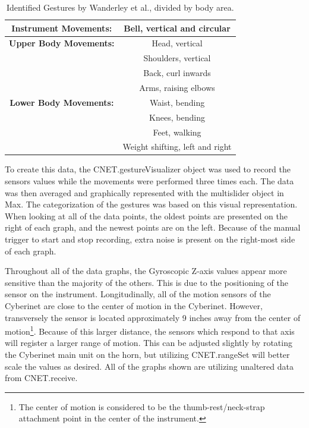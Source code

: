 \begin{table}[]
    \centering
    \begin{tabular}{|c||c|}
    \hline
       \textbf{Instrument Movements:}  & Bell, vertical and circular \\
       \hline
        \textbf{Upper Body Movements:} & Head, vertical \\
        & Shoulders, vertical \\
        & Back, curl inwards \\
        & Arms, raising elbows \\
        \hline
       \textbf{ Lower Body Movements:} & Waist, bending \\
        & Knees, bending \\
        & Feet, walking \\
        & Weight shifting, left and right\\
        \hline
    \end{tabular}
    \caption{Identified Gestures by Wanderley et al.\cite{wanderleyClarinetGesture2005}, divided by body area.}
    \label{tab:generalGestures2}
\end{table}

To create this data, the CNET.gestureVisualizer object was used to record the sensors values while the movements were performed three times each. The data was then averaged and graphically represented with the multislider object in Max. The categorization of the gestures was based on this visual representation. When looking at all of the data points, the oldest points are presented on the right of each graph, and the newest points are on the left. Because of the manual trigger to start and stop recording, extra noise is present on the right-most side of each graph. 

Throughout all of the data graphs, the Gyroscopic Z-axis values appear more sensitive than the majority of the others. This is due to the positioning of the sensor on the instrument. Longitudinally, all of the motion sensors of the Cyberinet are close to the center of motion in the Cyberinet. However, transversely the sensor is located approximately 9 inches away from the center of motion\footnote{The center of motion is considered to be the thumb-rest/neck-strap attachment point in the center of the instrument.}. Because of this larger distance, the sensors which respond to that axis will register a larger range of motion. This can be adjusted slightly by rotating the Cyberinet main unit on the horn, but utilizing CNET.rangeSet will better scale the values as desired. All of the graphs shown are utilizing unaltered data from CNET.receive.

